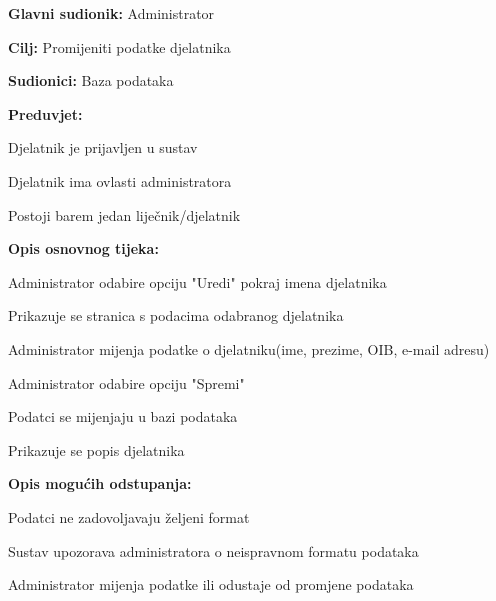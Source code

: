 				\noindent {}
				\begin{packed_item}
					
					\item \textbf{Glavni sudionik: }Administrator
					\item  \textbf{Cilj: }Promijeniti podatke djelatnika
					\item  \textbf{Sudionici: }Baza podataka
					\item  \textbf{Preduvjet: }
					\item[] \begin{packed_enum}
						
						\item[-] Djelatnik je prijavljen u sustav
						\item[-] Djelatnik ima ovlasti administratora
						\item[-] Postoji barem jedan liječnik/djelatnik
					\end{packed_enum}
					\item  \textbf{Opis osnovnog tijeka: }
					
					\item[] \begin{packed_enum}
						\item Administrator odabire opciju "Uredi" pokraj imena djelatnika
						\item Prikazuje se stranica s podacima odabranog djelatnika
						\item Administrator mijenja podatke o djelatniku(ime, prezime, OIB, e-mail adresu)
						\item Administrator odabire opciju "Spremi"
						\item Podatci se mijenjaju u bazi podataka
						\item Prikazuje se popis djelatnika
					\end{packed_enum}
					
					\item  \textbf{Opis mogućih odstupanja:}
					
					\item[] \begin{packed_item}
						
						\item[3.a] Podatci ne zadovoljavaju željeni format
						\item[] \begin{packed_enum}
							\item Sustav upozorava administratora o neispravnom formatu podataka
							\item Administrator mijenja podatke ili odustaje od promjene podataka							
						\end{packed_enum}
						

\end{packed_item}
\end{packed_item}
